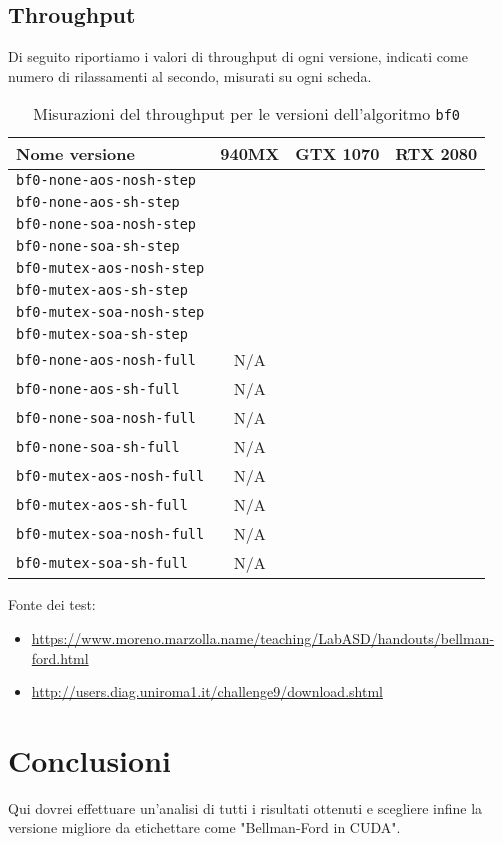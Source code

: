 \documentclass{article}
\begin{document}
	\subsection{Throughput}
	Di seguito riportiamo i valori di throughput di ogni versione, indicati come numero di rilassamenti al secondo, misurati su ogni scheda.
	\begin{table}[!ht]
		\centering
		\begin{tabular}{|l|c|c|c|}
			\hline
			\textbf{Nome versione} & \textbf{940MX} & \textbf{GTX 1070} & \textbf{RTX 2080} \\ \hline
			\texttt{bf0-none-aos-nosh-step}  &  &  &  \\ \hline
			\texttt{bf0-none-aos-sh-step}    &  &  &  \\ \hline
			\texttt{bf0-none-soa-nosh-step}  &  &  &  \\ \hline
			\texttt{bf0-none-soa-sh-step}    &  &  &  \\ \hline
			\texttt{bf0-mutex-aos-nosh-step} &  &  &  \\ \hline
			\texttt{bf0-mutex-aos-sh-step}   &  &  &  \\ \hline
			\texttt{bf0-mutex-soa-nosh-step} &  &  &  \\ \hline
			\texttt{bf0-mutex-soa-sh-step}   &  &  &  \\ \hline
			\texttt{bf0-none-aos-nosh-full}  & N/A &  &  \\ \hline
			\texttt{bf0-none-aos-sh-full}    & N/A &  &  \\ \hline
			\texttt{bf0-none-soa-nosh-full}  & N/A &  &  \\ \hline
			\texttt{bf0-none-soa-sh-full}    & N/A &  &  \\ \hline
			\texttt{bf0-mutex-aos-nosh-full} & N/A &  &  \\ \hline
			\texttt{bf0-mutex-aos-sh-full}   & N/A &  &  \\ \hline
			\texttt{bf0-mutex-soa-nosh-full} & N/A &  &  \\ \hline
			\texttt{bf0-mutex-soa-sh-full}   & N/A &  &  \\ \hline
		\end{tabular}
		\label{tab:throughput_bf0}
		\caption{Misurazioni del throughput per le versioni dell'algoritmo \texttt{bf0}}
	\end{table}
	
	
	
	Fonte dei test:
	\begin{itemize}
		\item \url{https://www.moreno.marzolla.name/teaching/LabASD/handouts/bellman-ford.html}
		\item \url{http://users.diag.uniroma1.it/challenge9/download.shtml}
	\end{itemize}
	
	\section{Conclusioni}
	\label{section:end}
	Qui dovrei effettuare un'analisi di tutti i risultati ottenuti e scegliere infine la versione migliore da etichettare come "Bellman-Ford in CUDA".
	
	\printbibliography
	
\end{document}
